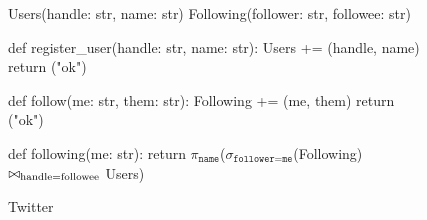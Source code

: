 \begin{figure}[ht]
  \centering
  {
    \small
    \begin{Python}[gobble=3]
      Users(handle: str, name: str)
      Following(follower: str, followee: str)

      def register_user(handle: str, name: str):
        Users += {(handle, name)}
        return {("ok")}

      def follow(me: str, them: str):
        Following += {(me, them)}
        return {("ok")}

      def following(me: str):
        return $\pi_{\texttt{name}}$($\sigma_{\texttt{follower=me}}$(Following) $\bowtie_{\text{handle=followee}}$ Users)
    \end{Python}
  }
  \caption{\dedalusplus{} Twitter}
\end{figure}
